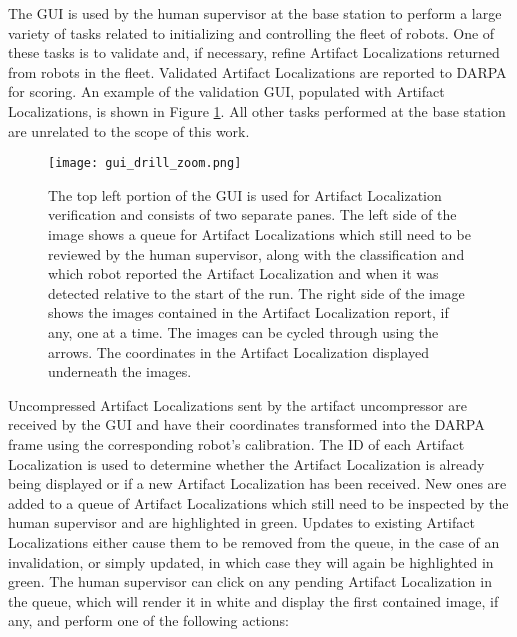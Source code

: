 The GUI is used by the human supervisor at the base station to perform a large variety of tasks related to initializing and controlling the fleet of robots. One of these tasks is to validate and, if necessary, refine Artifact Localizations returned from robots in the fleet. Validated Artifact Localizations are reported to DARPA for scoring. An example of the validation GUI, populated with Artifact Localizations, is shown in Figure \ref{gui}. All other tasks performed at the base station are unrelated to the scope of this work.

\begin{figure}
	\centering
	\texttt{[image: gui\_drill\_zoom.png]}
	\caption[GUI used for artifact localization validation]{The top left portion of the GUI is used for Artifact Localization verification and consists of two separate panes. The left side of the image shows a queue for Artifact Localizations which still need to be reviewed by the human supervisor, along with the classification and which robot reported the Artifact Localization and when it was detected relative to the start of the run. The right side of the image shows the images contained in the Artifact Localization report, if any, one at a time. The images can be cycled through using the arrows. The coordinates in the Artifact Localization displayed underneath the images.}
	\label{gui}
\end{figure}

Uncompressed Artifact Localizations sent by the artifact uncompressor are received by the GUI and have their coordinates transformed into the DARPA frame using the corresponding robot's calibration. The ID of each Artifact Localization is used to determine whether the Artifact Localization is already being displayed or if a new Artifact Localization has been received. New ones are added to a queue of Artifact Localizations which still need to be inspected by the human supervisor and are highlighted in green. Updates to existing Artifact Localizations either cause them to be removed from the queue, in the case of an invalidation, or simply updated, in which case they will again be highlighted in green. The human supervisor can click on any pending Artifact Localization in the queue, which will render it in white and display the first contained image, if any, and perform one of the following actions:

